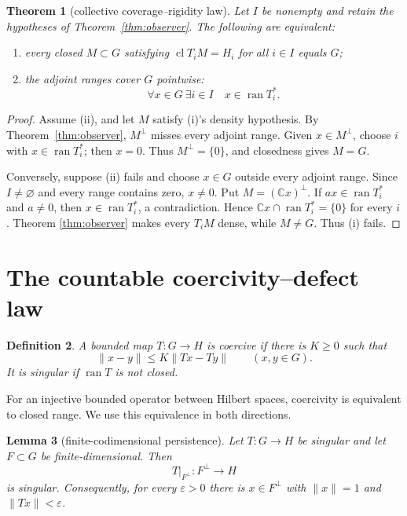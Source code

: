 \documentclass[11pt]{article}
\newtheorem{theorem}{Theorem}[section]
\newtheorem{lemma}[theorem]{Lemma}
\newtheorem{definition}[theorem]{Definition}
\newcommand{\ran}{\operatorname{ran}}
\newcommand{\clos}{\operatorname{cl}}
\begin{document}
\begin{theorem}[collective coverage--rigidity law]\label{thm:coverage}
Let \(I\) be nonempty and retain the hypotheses of
Theorem~\ref{thm:observer}.  The following are equivalent:
\begin{enumerate}[label=(\roman*)]
  \item every closed \(M\subset G\) satisfying
  \(\clos{T_iM}=H_i\) for all \(i\in I\) equals \(G\);
  \item the adjoint ranges cover \(G\) pointwise:
  \[
    \forall x\in G\ \exists i\in I\quad x\in\ran T_i^*.
    \tag{2.4}
  \]
\end{enumerate}
\end{theorem}

\begin{proof}
Assume (ii), and let \(M\) satisfy (i)'s density hypothesis.  By
Theorem~\ref{thm:observer}, \(M^\perp\) misses every adjoint range.  Given
\(x\in M^\perp\), choose \(i\) with \(x\in\ran T_i^*\); then \(x=0\).
Thus \(M^\perp=\{0\}\), and closedness gives \(M=G\).

Conversely, suppose (ii) fails and choose \(x\in G\) outside every adjoint
range.  Since \(I\ne\varnothing\) and every range contains zero, \(x\ne0\).
Put \(M=(\mathbb Cx)^\perp\).  If
\(a x\in\ran T_i^*\) and \(a\ne0\), then \(x\in\ran T_i^*\), a contradiction.
Hence \(\mathbb Cx\cap\ran T_i^*=\{0\}\) for every \(i\).  Theorem
\ref{thm:observer} makes every \(T_iM\) dense, while \(M\ne G\).  Thus (i)
fails.
\end{proof}

\section{The countable coercivity--defect law}\label{sec:law}

\begin{definition}\label{def:coercive}
A bounded map \(T:G\to H\) is \emph{coercive} if there is \(K\ge0\) such that
\[
  \|x-y\|\le K\|Tx-Ty\|\qquad(x,y\in G).
  \tag{3.1}
\]
It is \emph{singular} if \(\ran T\) is not closed.
\end{definition}

For an injective bounded operator between Hilbert spaces, coercivity is
equivalent to closed range.  We use this equivalence in both directions.

\begin{lemma}[finite-codimensional persistence]\label{lem:persistence}
Let \(T:G\to H\) be singular and let \(F\subset G\) be finite-dimensional.
Then
\[
  T|_{F^\perp}:F^\perp\longrightarrow H
  \tag{3.2}
\]
is singular.  Consequently, for every \(\varepsilon>0\) there is
\(x\in F^\perp\) with \(\|x\|=1\) and \(\|Tx\|<\varepsilon\).
\end{lemma}
\end{document}
